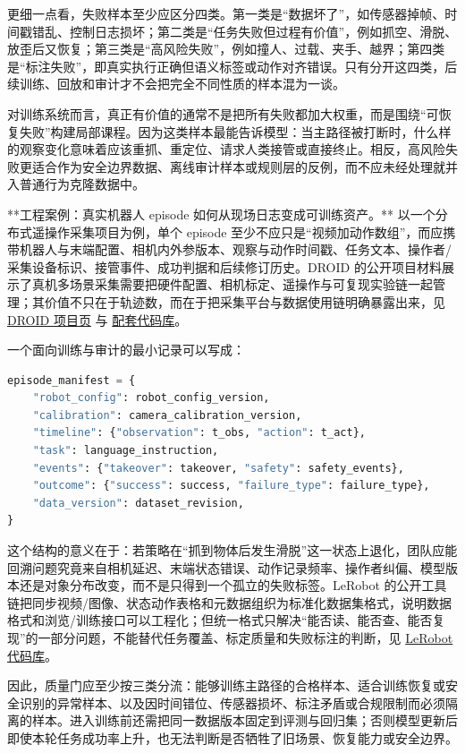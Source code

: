 更细一点看，失败样本至少应区分四类。第一类是“数据坏了”，如传感器掉帧、时间戳错乱、控制日志损坏；第二类是“任务失败但过程有价值”，例如抓空、滑脱、放歪后又恢复；第三类是“高风险失败”，例如撞人、过载、夹手、越界；第四类是“标注失败”，即真实执行正确但语义标签或动作对齐错误。只有分开这四类，后续训练、回放和审计才不会把完全不同性质的样本混为一谈。

对训练系统而言，真正有价值的通常不是把所有失败都加大权重，而是围绕“可恢复失败”构建局部课程。因为这类样本最能告诉模型：当主路径被打断时，什么样的观察变化意味着应该重抓、重定位、请求人类接管或直接终止。相反，高风险失败更适合作为安全边界数据、离线审计样本或规则层的反例，而不应未经处理就并入普通行为克隆数据中。

**工程案例：真实机器人 episode 如何从现场日志变成可训练资产。** 以一个分布式遥操作采集项目为例，单个 episode 至少不应只是“视频加动作数组”，而应携带机器人与末端配置、相机内外参版本、观察与动作时间戳、任务文本、操作者/采集设备标识、接管事件、成功判据和后续修订历史。DROID 的公开项目材料展示了真机多场景采集需要把硬件配置、相机标定、遥操作与可复现实验链一起管理；其价值不只在于轨迹数，而在于把采集平台与数据使用链明确暴露出来，见 \href{https://droid-dataset.github.io/}{DROID 项目页} 与 \href{https://github.com/droid-dataset/droid}{配套代码库}。

一个面向训练与审计的最小记录可以写成：

\begin{lstlisting}[language=python]
episode_manifest = {
    "robot_config": robot_config_version,
    "calibration": camera_calibration_version,
    "timeline": {"observation": t_obs, "action": t_act},
    "task": language_instruction,
    "events": {"takeover": takeover, "safety": safety_events},
    "outcome": {"success": success, "failure_type": failure_type},
    "data_version": dataset_revision,
}
\end{lstlisting}

这个结构的意义在于：若策略在“抓到物体后发生滑脱”这一状态上退化，团队应能回溯问题究竟来自相机延迟、末端状态错误、动作记录频率、操作者纠偏、模型版本还是对象分布改变，而不是只得到一个孤立的失败标签。LeRobot 的公开工具链把同步视频/图像、状态动作表格和元数据组织为标准化数据集格式，说明数据格式和浏览/训练接口可以工程化；但统一格式只解决“能否读、能否查、能否复现”的一部分问题，不能替代任务覆盖、标定质量和失败标注的判断，见 \href{https://github.com/huggingface/lerobot}{LeRobot 代码库}。

因此，质量门应至少按三类分流：能够训练主路径的合格样本、适合训练恢复或安全识别的异常样本、以及因时间错位、传感器损坏、标注矛盾或合规限制而必须隔离的样本。进入训练前还需把同一数据版本固定到评测与回归集；否则模型更新后即使本轮任务成功率上升，也无法判断是否牺牲了旧场景、恢复能力或安全边界。

